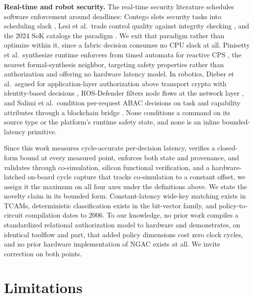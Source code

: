 \documentclass[conference]{IEEEtran}
\newcommand{\new}[1]{\textcolor{hkred}{#1}}
\begin{document}
\textbf{Real-time and robot security.} The real-time security literature schedules software enforcement around deadlines: Contego slots security tasks into scheduling slack \cite{hasan2017contego}, Lesi et al.\ trade control quality against integrity checking \cite{lesi2017security}, and the 2024 SoK catalogs the paradigm \cite{hasan2024sok}. We exit that paradigm rather than optimize within it, since a fabric decision consumes no CPU slack at all. Pinisetty et al.\ synthesize runtime enforcers from timed automata for reactive CPS \cite{pinisetty2017runtime}, the nearest formal-synthesis neighbor, targeting safety properties rather than authorization and offering no hardware latency model. In robotics, Dieber et al.\ argued for application-layer authorization above transport crypto with identity-based decisions \cite{dieber2017security}, ROS-Defender filters node flows at the network layer \cite{rivera2019rosdefender}, and Salimi et al.\ condition per-request ABAC decisions on task and capability attributes through a blockchain bridge \cite{salimi2025abac}. None conditions a command on its source type or the platform's runtime safety state, and none is an inline bounded-latency primitive.

Since this work measures cycle-accurate per-decision latency, verifies a closed-form bound at every measured point, enforces both state and provenance, and validates through co-simulation, silicon functional verification, \new{and a hardware-latched on-board cycle capture that tracks co-simulation to a constant offset}, we assign it the maximum on all four axes under the definitions above. We state the novelty claim in its bounded form. Constant-latency wide-key matching exists in TCAMs, deterministic classification exists in the bit-vector family, and policy-to-circuit compilation dates to 2006. To our knowledge, no prior work compiles a standardized relational authorization model to hardware and demonstrates, on identical toolflow and part, that added policy dimensions cost zero clock cycles, and no prior hardware implementation of NGAC exists at all. We invite correction on both points.

\section{Limitations}
\end{document}
